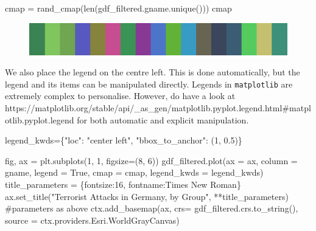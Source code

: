 \documentclass[
  letterpaper,
  DIV=11,
  numbers=noendperiod]{scrreprt}
\newenvironment{Shaded}{\begin{snugshade}}{\end{snugshade}}
\newcommand{\BuiltInTok}[1]{\textcolor[rgb]{0.00,0.23,0.31}{#1}}
\newcommand{\CommentTok}[1]{\textcolor[rgb]{0.37,0.37,0.37}{#1}}
\newcommand{\DecValTok}[1]{\textcolor[rgb]{0.68,0.00,0.00}{#1}}
\newcommand{\FloatTok}[1]{\textcolor[rgb]{0.68,0.00,0.00}{#1}}
\newcommand{\NormalTok}[1]{\textcolor[rgb]{0.00,0.23,0.31}{#1}}
\newcommand{\OperatorTok}[1]{\textcolor[rgb]{0.37,0.37,0.37}{#1}}
\newcommand{\StringTok}[1]{\textcolor[rgb]{0.13,0.47,0.30}{#1}}
\newcommand{\VariableTok}[1]{\textcolor[rgb]{0.07,0.07,0.07}{#1}}
\begin{document}
\begin{Shaded}
\begin{Highlighting}[]
\NormalTok{cmap }\OperatorTok{=}\NormalTok{ rand\_cmap(}\BuiltInTok{len}\NormalTok{(gdf\_filtered.gname.unique()))}
\NormalTok{cmap}
\end{Highlighting}
\end{Shaded}

\begin{figure}[H]

{\centering \includegraphics{labs/w02_maps_files/figure-pdf/cell-45-output-1.png}

}

\end{figure}

We also place the legend on the centre left. This is done automatically,
but the legend and its items can be manipulated directly. Legends in
\texttt{matplotlib} are extremely complex to personalise. However, do
have a look at
https://matplotlib.org/stable/api/\_as\_gen/matplotlib.pyplot.legend.html\#matplotlib.pyplot.legend
for both automatic and explicit manipulation.

\begin{Shaded}
\begin{Highlighting}[]
\NormalTok{legend\_kwds}\OperatorTok{=}\NormalTok{\{}\StringTok{"loc"}\NormalTok{: }\StringTok{"center left"}\NormalTok{, }\StringTok{"bbox\_to\_anchor"}\NormalTok{: (}\DecValTok{1}\NormalTok{, }\FloatTok{0.5}\NormalTok{)\}}
\end{Highlighting}
\end{Shaded}

\begin{Shaded}
\begin{Highlighting}[]
\NormalTok{fig, ax }\OperatorTok{=}\NormalTok{ plt.subplots(}\DecValTok{1}\NormalTok{, }\DecValTok{1}\NormalTok{, figsize}\OperatorTok{=}\NormalTok{(}\DecValTok{8}\NormalTok{, }\DecValTok{6}\NormalTok{))}
\NormalTok{gdf\_filtered.plot(ax }\OperatorTok{=}\NormalTok{ ax, column }\OperatorTok{=} \StringTok{\textquotesingle{}gname\textquotesingle{}}\NormalTok{, legend }\OperatorTok{=} \VariableTok{True}\NormalTok{, cmap }\OperatorTok{=}\NormalTok{ cmap, legend\_kwds }\OperatorTok{=}\NormalTok{ legend\_kwds)}
\NormalTok{title\_parameters }\OperatorTok{=}\NormalTok{ \{}\StringTok{\textquotesingle{}fontsize\textquotesingle{}}\NormalTok{:}\StringTok{\textquotesingle{}16\textquotesingle{}}\NormalTok{, }\StringTok{\textquotesingle{}fontname\textquotesingle{}}\NormalTok{:}\StringTok{\textquotesingle{}Times New Roman\textquotesingle{}}\NormalTok{\}}
\NormalTok{ax.set\_title(}\StringTok{"Terrorist Attacks in Germany, by Group"}\NormalTok{, }\OperatorTok{**}\NormalTok{title\_parameters) }\CommentTok{\#parameters as above}
\NormalTok{ctx.add\_basemap(ax, crs}\OperatorTok{=}\NormalTok{ gdf\_filtered.crs.to\_string(), source }\OperatorTok{=}\NormalTok{ ctx.providers.Esri.WorldGrayCanvas)}
\end{Highlighting}
\end{Shaded}
\end{document}
